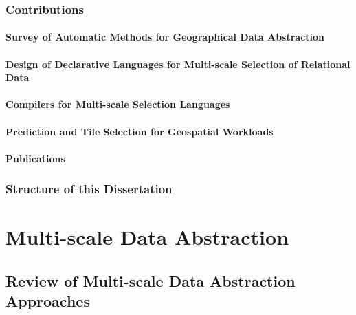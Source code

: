 \documentclass[11pt, oneside]{report}   	%
\begin{document}

\section{Contributions}
\subsection{Survey of Automatic Methods for Geographical Data Abstraction}
\subsection{Design of Declarative Languages for Multi-scale Selection of Relational Data}
\subsection{Compilers for Multi-scale Selection Languages}
\subsection{Prediction and Tile Selection for Geospatial Workloads}
\subsection{Publications}

\section{Structure of this Dissertation}

\part{Multi-scale Data Abstraction}
\chapter{Review of Multi-scale Data Abstraction Approaches}
\end{document}
